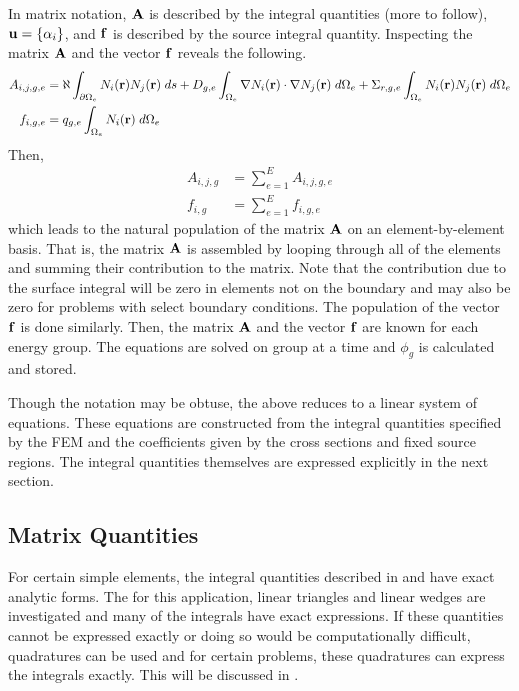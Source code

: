    In matrix notation, $\mathbf{A}$ is described by the integral quantities (more to 
    follow),  $\mathbf{u} = \{\alpha_i\}$, and $\mathbf{f}$ is described by the source 
    integral quantity. Inspecting the matrix $\mathbf{A}$ and the vector $\mathbf{f}$ reveals 
    the following.
    \begin{align}
      \label{eq:matrix_population}
      A_{i,j,g,e} &= \aleph \int_{\partial \Omega_e} N_i(\mathbf{r}) 
        N_j(\mathbf{r}) \; ds + D_{g,e} 
        \int_{\Omega_e} \mathbf{\nabla} N_i(\mathbf{r}) \cdot \mathbf{\nabla} N_j(\mathbf{r}) \;
        d\Omega_e + \Sigma_{r,g,e} \int_{\Omega_e} N_i(\mathbf{r}) N_j(\mathbf{r})
        \; d\Omega_e \\
      \label{eq:vector_population}
      f_{i,g,e} &= q_{g,e} \int_{\Omega_e} N_i(\mathbf{r}) \;d\Omega_e
    \end{align}
    Then, 
    \begin{align}
      A_{i,j,g} &= \sum_{e=1}^{E} A_{i,j,g,e} \\
      f_{i,g} &=  \sum_{e=1}^{E} f_{i,g,e}
    \end{align}
    which leads to the natural population of the matrix $\mathbf{A}$ on an 
    element-by-element basis. That is, the matrix $\mathbf{A}$ is assembled by looping
    through all of the elements and summing their contribution to the matrix. 
    Note that the contribution due to the surface integral will be zero in 
    elements not on the boundary and may also be zero for problems with select
    boundary conditions. The population of the vector $\mathbf{f}$ is done similarly. 
    Then, the matrix $\mathbf{A}$ and the vector $\mathbf{f}$ are known for each energy group.
    The equations are solved on group at a time and $\phi_g$ is calculated and 
    stored.
    
    Though the notation may be obtuse, the above reduces to a linear system of
    equations. These equations are constructed from the integral quantities 
    specified by the FEM and the coefficients given by the cross sections and
    fixed source regions. The integral quantities themselves are expressed 
    explicitly in the next section.
    
  \subsection{Matrix Quantities}
    \label{sec:matrix_quantities}
    For certain simple elements, the integral quantities described in 
     and  have exact 
    analytic forms. The for this application, linear triangles and linear wedges
    are investigated and many of the integrals have exact expressions. If these 
    quantities cannot be expressed exactly or doing so would be computationally
    difficult, quadratures can be used and for certain problems, these 
    quadratures can express the integrals exactly. This will be discussed in 
    .
